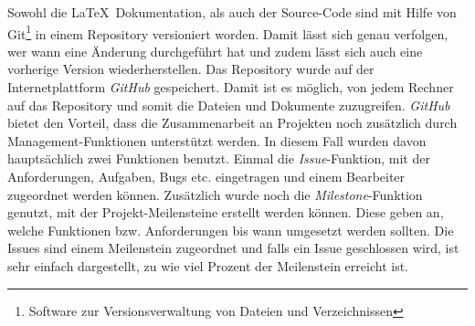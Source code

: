 Sowohl die \LaTeX\ Dokumentation, als auch der Source-Code sind mit Hilfe von Git\footnote{Software zur Versionsverwaltung von Dateien und Verzeichnissen}  in einem Repository versioniert worden. Damit lässt sich genau verfolgen, wer wann eine Änderung durchgeführt hat und zudem lässt sich auch eine vorherige Version wiederherstellen.
Das Repository wurde auf der Internetplattform \textit{GitHub} gespeichert. Damit ist es möglich, von jedem Rechner auf das Repository und somit die Dateien und Dokumente zuzugreifen. \textit{GitHub} bietet den Vorteil, dass die Zusammenarbeit an Projekten noch zusätzlich durch Management-Funktionen unterstützt werden. In diesem Fall wurden davon hauptsächlich zwei Funktionen benutzt. Einmal die \textit{Issue}-Funktion, mit der Anforderungen, Aufgaben, Bugs etc. eingetragen und einem Bearbeiter zugeordnet werden können. Zusätzlich wurde noch die \textit{Milestone}-Funktion genutzt, mit der Projekt-Meilensteine erstellt werden können. Diese geben an, welche Funktionen bzw. Anforderungen bis wann umgesetzt werden sollten. Die Issues sind einem Meilenstein zugeordnet und falls ein Issue geschlossen wird, ist sehr einfach dargestellt, zu wie viel Prozent der Meilenstein erreicht ist.
